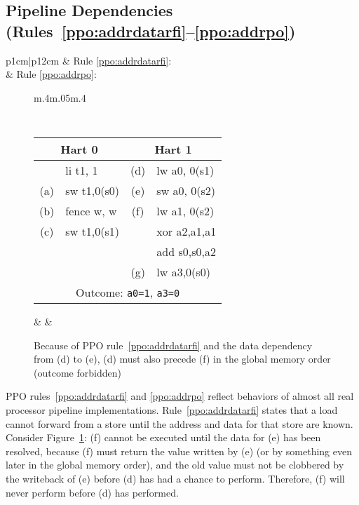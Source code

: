 \subsection{Pipeline Dependencies (Rules~\ref{ppo:addrdatarfi}--\ref{ppo:addrpo})}
\label{sec:ppopipeline}
\begin{tabular}{p{1cm}|p{12cm}}
  & Rule \ref{ppo:addrdatarfi}: \ppoaddrdatarfi \\
  & Rule \ref{ppo:addrpo}: \ppoaddrpo \\
\end{tabular}

\begin{figure}[h!]
  \centering
  \begin{tabular}{m{.4\linewidth}m{.05\linewidth}m{.4\linewidth}}
  {
    \tt\small
    \begin{tabular}{cl||cl}
    \multicolumn{2}{c}{Hart 0} & \multicolumn{2}{c}{Hart 1} \\
    \hline
          & li t1, 1    & (d) & lw a0, 0(s1)   \\
      (a) & sw t1,0(s0) & (e) & sw a0, 0(s2)   \\
      (b) & fence w, w  & (f) & lw a1, 0(s2)   \\
      (c) & sw t1,0(s1) &     & xor a2,a1,a1   \\
          &             &     & add s0,s0,a2   \\
          &             & (g) & lw a3,0(s0)    \\   
      \hline
      \multicolumn{4}{c}{Outcome: {\tt a0=1}, {\tt a3=0}}
    \end{tabular}
  } & &
  
  \end{tabular}

  \caption{Because of PPO rule~\ref{ppo:addrdatarfi} and the data dependency from (d) to (e), (d) must also precede (f) in the global memory order (outcome forbidden)}
  \label{fig:litmus:addrdatarfi}
\end{figure}

PPO rules~\ref{ppo:addrdatarfi} and \ref{ppo:addrpo} reflect behaviors of almost all real processor pipeline implementations.
Rule~\ref{ppo:addrdatarfi} states that a load cannot forward from a store until the address and data for that store are known.
Consider Figure~\ref{fig:litmus:addrdatarfi}:
(f) cannot be executed until the data for (e) has been resolved, because (f) must return the value written by (e) (or by something even later in the global memory order), and the old value must not be clobbered by the writeback of (e) before (d) has had a chance to perform.
Therefore, (f) will never perform before (d) has performed.

